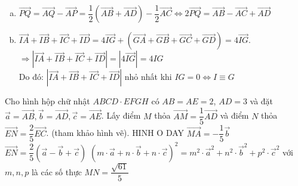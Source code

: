 \begin{ex}
{\begin{enumerate}[a)]
			      Do đó: $\vec{GA}+\vec{GB}+\vec{GC}+\vec{GD}=2\left(\vec{GM}+\vec{GN}\right)=2 \cdot \vec{0}=\vec{0}$.
			\item $\vec{PQ}=\vec{AQ}-\vec{AP}=\dfrac{1}{2}\left(\vec{AB}+\vec{AD}\right)-\dfrac{1}{2}\vec{AC}\Leftrightarrow 2\vec{PQ}=\vec{AB}-\vec{AC}+\vec{AD}$
			\item $\vec{IA}+\vec{IB}+\vec{IC}+\vec{ID}=4\vec{IG}+\left(\vec{GA}+\vec{GB}+\vec{GC}+\vec{GD}\right)=4\vec{IG}$.\\
			      $\Rightarrow | \vec{IA}+\vec{IB}+\vec{IC}+\vec{ID}|=| 4\vec{IG}|=4IG$\\
			      Do đó: $| \vec{IA}+\vec{IB}+\vec{IC}+\vec{ID}|$ nhỏ nhất khi $IG=0\Leftrightarrow I\equiv G$
		\end{enumerate}
	}
\end{ex}
\begin{ex}
	Cho hình hộp chữ nhật $ABCD \cdot EFGH$ có $AB=AE=2$, $AD=3$ và đặt $\vec{a}=\vec{AB},\vec{b}=\vec{AD},\vec{c}=\vec{AE}$. Lấy điểm $M$ thỏa $\vec{AM}=\dfrac{1}{5}\vec{AD}$ và điểm $N$ thỏa $\vec{EN}=\dfrac{2}{5}\vec{EC}$. (tham khảo hình vẽ).
		{\centering\color{red} HINH O DAY}
	\choiceTF
	{\True $\vec{MA}=-\dfrac{1}{5}\vec{b}$}
	{\True $\vec{EN}=\dfrac{2}{5}\left(\vec{a}-\vec{b}+\vec{c}\right)$}
	{${{\left(m \cdot \vec{a}+n \cdot \vec{b}+n \cdot \vec{c}\right)}^2}=m^2 \cdot {{\vec{a}}^2}+n^2 \cdot {{\vec{b}}^2}+p^2 \cdot {{\vec{c}}^2}$ với $m,n,p$ là các số thực}
	{\True $MN=\dfrac{\sqrt{61}}{5}$}
\end{ex}
